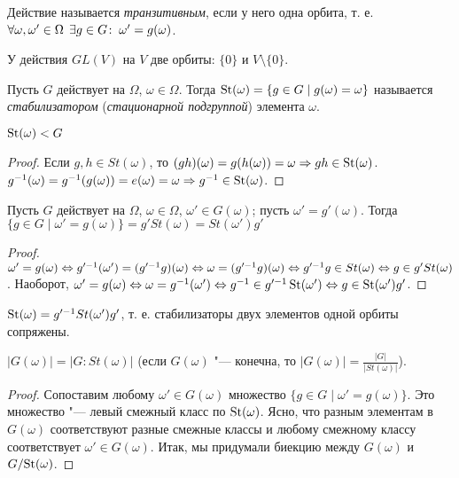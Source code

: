 \documentclass[main]{subfiles}
\begin{document}
\begin{definition}
  Действие называется \emph{транзитивным}, если у него одна орбита,
  т. е. $\forall {\omega, \omega' \in \Omega} \; \, \exists g \in G \colon \:
  \omega' = g(\omega)$.
\end{definition}

\begin{example}
  У действия $GL(V)$ на $V$ две орбиты: $\{ 0 \}$ и $V \setminus \{0\}$.
\end{example}

\begin{definition}
  Пусть $G$ действует на $\Omega$, $\omega \in \Omega$.
  Тогда $\operatorname{St}(\omega) =
  \{ g \in G \mid g(\omega) = \omega \}$
  называется \emph{стабилизатором}
  (\emph{стационарной подгруппой})
  элемента $\omega$.
\end{definition}

\begin{proposition}
  $\operatorname{St}(\omega) < G$
\end{proposition}
\begin{proof}
  Если $g, h \in St(\omega)$,
  то $(gh)(\omega) = g(h(\omega)) =
  \omega \Rightarrow gh \in \operatorname{St}(\omega)$.
  $g^{-1}(\omega) = g^{-1}(g(\omega)) = e(\omega) = \omega
  \Rightarrow g^{-1} \in \operatorname{St}(\omega)$.
\end{proof}

\begin{proposition}
  Пусть $G$ действует на $\Omega$,
  $\omega \in \Omega$,
  $\omega' \in G(\omega)$;
  пусть $\omega' = g'(\omega)$.
  Тогда $\{ g \in G \mid \omega' = g(\omega) \} = g' St(\omega) =
  St(\omega') g'$
\end{proposition}
\begin{proof}
  $\omega' = g(\omega) \Leftrightarrow g'^{-1}(\omega') = (g'^{-1}g)(\omega) \Leftrightarrow
  \omega = (g'^{-1}g)(\omega) \Leftrightarrow g'^{-1}g \in St(\omega) \Leftrightarrow
  g \in g'St(\omega)$. Наоборот, $\omega' = g(\omega) \Leftrightarrow \omega = g^{-1}(\omega')
  \Leftrightarrow g^{-1} \in g'^{-1} \operatorname{St}(\omega') \Leftrightarrow g \in \operatorname{St}(\omega') g'$.
\end{proof}
\begin{corollary}
  $\operatorname{St}(\omega) = g'^{-1} St(\omega') g'$,
  т. е. стабилизаторы двух элементов одной
  орбиты сопряжены.
\end{corollary}

\begin{corollary}
  $|G(\omega)| = |G : St(\omega)|$
  (если $G(\omega)$ "--- конечна,
  то $|G(\omega)| = \frac{|G|}{|St(\omega)|}$).
\end{corollary}
\begin{proof}
  Сопоставим любому $\omega' \in G(\omega)$
  множество $\{ g \in G \mid \omega' = g(\omega) \}$.
  Это множество "---
  левый смежный класс по $\operatorname{St}(\omega)$.
  Ясно, что разным элементам в $G(\omega)$
  соответствуют разные смежные классы и
  любому смежному классу соответствует 
  $\omega' \in G(\omega)$.
  Итак, мы придумали биекцию
  между $G(\omega)$ и $\Factor{G}[\St(\omega)]$.
\end{proof}
\end{document}
